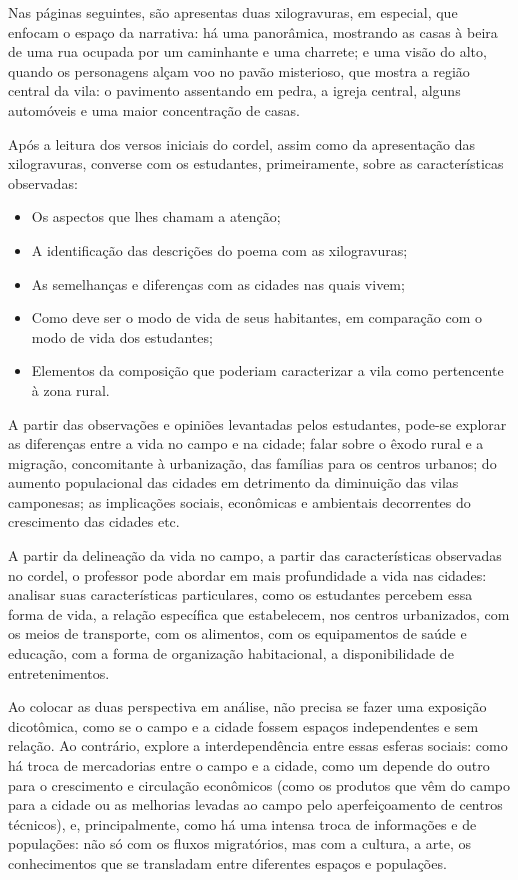 \documentclass[11pt]{extarticle}
\begin{document}
Nas páginas seguintes, são apresentas duas xilogravuras, em especial, que enfocam o espaço da narrativa: há uma panorâmica, mostrando as casas à beira de uma rua ocupada por um caminhante e uma charrete; e uma visão do alto, quando os personagens alçam voo no pavão misterioso, que mostra a região central da vila: o pavimento assentando em pedra, a igreja central, alguns automóveis e uma maior concentração de casas.

Após a leitura dos versos iniciais do cordel, assim como da apresentação das xilogravuras, converse com os estudantes, primeiramente, sobre as características observadas:

\begin{itemize}
\item Os aspectos que lhes chamam a atenção;

\item A identificação das descrições do poema com as xilogravuras;

\item As semelhanças e diferenças com as cidades nas quais vivem;

\item Como deve ser o modo de vida de seus habitantes, em comparação com o modo de vida dos estudantes;

\item Elementos da composição que poderiam caracterizar a vila como pertencente à zona rural.

\end{itemize}

A partir das observações e opiniões levantadas pelos estudantes, pode-se explorar as diferenças entre a vida no campo e na cidade; falar sobre o êxodo rural e a migração, concomitante à urbanização, das famílias para os centros urbanos; do aumento populacional das cidades em detrimento da diminuição das vilas camponesas; as implicações sociais, econômicas e ambientais decorrentes do crescimento das cidades etc.

A partir da delineação da vida no campo, a partir das características observadas no cordel, o professor pode abordar em mais profundidade a vida nas cidades: analisar suas características particulares, como os estudantes percebem essa forma de vida, a relação específica que estabelecem, nos centros urbanizados, com os meios de transporte, com os alimentos, com os equipamentos de saúde e educação, com a forma de organização habitacional, a disponibilidade de entretenimentos.

Ao colocar as duas perspectiva em análise, não precisa se fazer uma exposição dicotômica, como se o campo e a cidade fossem espaços independentes e sem relação. Ao contrário, explore a interdependência entre essas esferas sociais: como há troca de mercadorias entre o campo e a cidade, como um depende do outro para o crescimento e circulação econômicos (como os produtos que vêm do campo para a cidade ou as melhorias levadas ao campo pelo aperfeiçoamento de centros técnicos), e, principalmente, como há uma intensa troca de informações e de populações: não só com os fluxos migratórios, mas com a cultura, a arte, os conhecimentos que se transladam entre diferentes espaços e populações.
\end{document}
